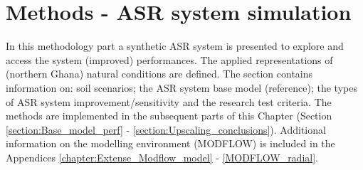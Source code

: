 \section{Methods - ASR system simulation}
\label{section:test_problem_def}
In this methodology part a synthetic ASR system is presented to explore and access the system (improved) performances. The applied representations of (northern Ghana) natural conditions are defined. The section contains information on: soil scenarios; the ASR system base model (reference); the types of ASR system improvement/sensitivity and the research test criteria. The methods are implemented in the subsequent parts of this Chapter (Section \ref{section:Base_model_perf} - \ref{section:Upscaling_conclusions}). Additional information on the modelling environment (MODFLOW) is included in the Appendices \ref{chapter:Extense_Modflow_model} - \ref{MODFLOW_radial}. 

%
%
 
